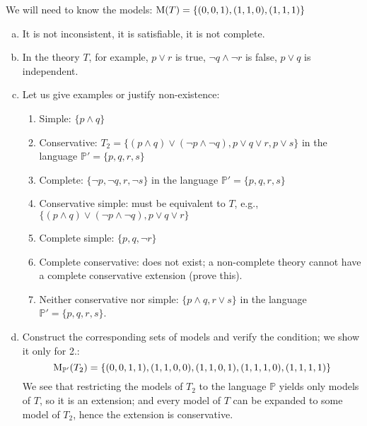 \begin{problem}
    \begin{solution}
        We will need to know the models: $\operatorname{M}(T)=\{(0,0,1),(1,1,0),(1,1,1)\}$
        \begin{enumerate}[(a)]
            \item It is not inconsistent, it is satisfiable, it is not complete.
            \item In the theory $T$, for example, $p\lor r$ is true, $\neg q\land\neg r$ is false, $p\lor q$ is independent.  
            \item Let us give examples or justify non-existence:
            \begin{enumerate}[1.]
                \item Simple: $\{p\land q\}$
                \item Conservative: $T_2=\{(p\land q)\lor(\neg p\land\neg q), p\lor q\lor r,p\lor s\}$ in the language $\mathbb P'=\{p,q,r,s\}$
                \item Complete: $\{\neg p,\neg q,r,\neg s\}$ in the language $\mathbb P'=\{p,q,r,s\}$
                \item Conservative simple: must be equivalent to $T$, e.g., $\{(p\land q)\lor(\neg p\land\neg q), p\lor q\lor r\}$
                \item Complete simple: $\{p,q,\neg r\}$
                \item Complete conservative: does not exist; a non-complete theory cannot have a complete conservative extension (prove this).
                \item Neither conservative nor simple: $\{p\land q,r\lor s\}$ in the language $\mathbb P'=\{p,q,r,s\}$.
            \end{enumerate}
            \item Construct the corresponding sets of models and verify the condition; we show it only for 2.:
            $$
            \operatorname{M}_{\mathbb P'}(T_2)=\{(0,0,1,1),(1,1,0,0),(1,1,0,1),(1,1,1,0),(1,1,1,1)\}
            $$
            We see that restricting the models of $T_2$ to the language $\mathbb P$ yields only models of $T$, so it is an extension; and every model of $T$ can be expanded to some model of $T_2$, hence the extension is conservative.
        \end{enumerate}
            
    \end{solution}
    
\end{problem}


